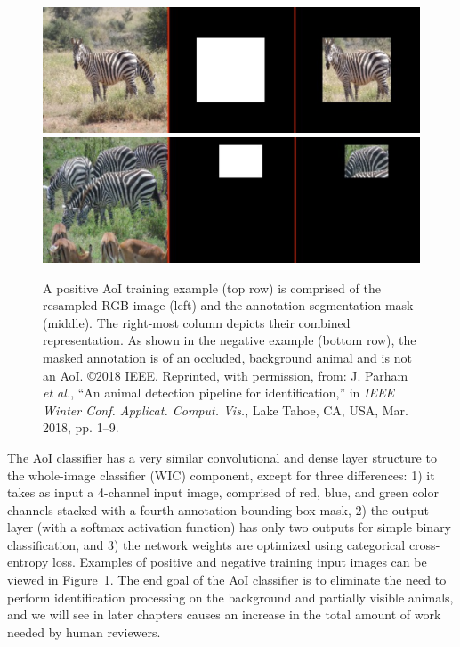 \begin{figure}[!t]
    \begin{center}
        \includegraphics[width=0.75\linewidth]{resources/aoi-true.pdf} \\
        \vspace{0.040cm}
        \includegraphics[width=0.75\linewidth]{resources/aoi-false.pdf}
    \end{center}
    \caption{A positive AoI training example (top row) is comprised of the resampled RGB image (left) and the annotation segmentation mask (middle).  The right-most column depicts their combined representation.  As shown in the negative example (bottom row), the masked annotation is of an occluded, background animal and is not an AoI.  \copyright 2018 IEEE. Reprinted, with permission, from: J. Parham \textit{et al.}, ``An animal detection pipeline for identification,'' in \textit{IEEE Winter Conf. Applicat. Comput. Vis.}, Lake Tahoe, CA, USA, Mar. 2018, pp. 1–9.}
    \label{fig:aoi}
\end{figure}

The AoI classifier has a very similar convolutional and dense layer structure to the whole-image classifier (WIC) component, except for three differences: 1) it takes as input a 4-channel input image, comprised of red, blue, and green color channels stacked with a fourth annotation bounding box mask, 2) the output layer (with a softmax activation function) has only two outputs for simple binary classification, and 3) the network weights are optimized using categorical cross-entropy loss.  Examples of positive and negative training input images can be viewed in Figure~\ref{fig:aoi}.  The end goal of the AoI classifier is to eliminate the need to perform identification processing on the background and partially visible animals, and we will see in later chapters causes an increase in the total amount of work needed by human reviewers.

